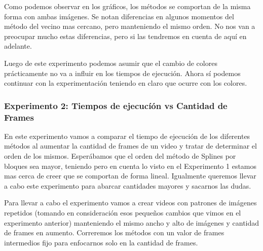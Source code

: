 \par Como podemos observar en los gr\'aficos, los m\'etodos se comportan de la misma forma con ambas im\'agenes. Se notan diferencias en algunos momentos del m\'etodo del vecino mas cercano, pero manteniendo el mismo orden. No nos van a preocupar mucho estas diferencias, pero si las tendremos en cuenta de aqu\'i en adelante.
\par Luego de este experimento podemos asumir que el cambio de colores pr\'acticamente no va a influir en los tiempos de ejecuci\'on. Ahora s\'i podemos continuar con la experimentaci\'on teniendo en claro que ocurre con los colores.


\subsubsection{Experimento 2: Tiempos de ejecucí\'on vs Cantidad de Frames}
\par En este experimento vamos a comparar el tiempo de ejecuci\'on de los diferentes m\'etodos al aumentar la cantidad de frames de un video y tratar de determinar el orden de los mismos. Esper\'abamos que el orden del m\'etodo de Splines por bloques sea mayor, teniendo pero en cuenta lo visto en el Experimento 1 estamos mas cerca de creer que se comportan de forma lineal. Igualmente queremos llevar a cabo este experimento para abarcar cantidades mayores y sacarnos las dudas.

\par Para llevar a cabo el experimento vamos a crear videos con patrones de im\'agenes repetidos (tomando en consideraci\'on esos pequeños cambios que vimos en el experimento anterior) manteniendo el mismo ancho y alto de im\'agenes y cantidad de frames en aumento. Correremos los m\'etodos con un valor de frames intermedios fijo para enfocarnos solo en la cantidad de frames.


